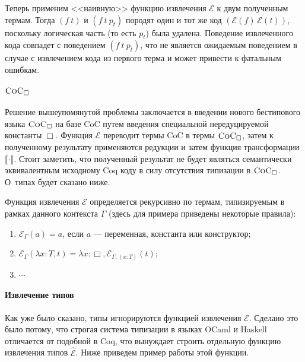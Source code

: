 Теперь применим <<наивную>> функцию извлечения $\mathcal{E}$ к двум полученным термам. Тогда $(f\ t)$ и $(f\ t\ p_t)$ породят один и тот же код $(\mathcal{E}(f)\ \mathcal{E}(t))$, поскольку логическая часть (то есть $p_t$) была удалена. Поведение извлеченного кода совпадет с поведением $(f\ t\ p_t)$, что не является ожидаемым поведением в случае с извлечением кода из первого терма и может привести к фатальным ошибкам.

\paragraph{$\textsc{CoC}_\Box$}

Решение вышеупомянутой проблемы заключается в введении нового бестипового языка $\textsc{CoC}_\Box$ на базе CoC путем введения специальной нередуцируемой константы $\Box$.  Функция $\mathcal{E}$ переводит термы CoC в термы $\textsc{CoC}_\Box$, затем к полученному результату применяются редукции и затем функция трансформации $\llbracket \cdot \rrbracket$. Стоит заметить, что полученный результат не будет являться семантически эквивалентным исходному Coq коду в силу отсутствия типизации в $\textsc{CoC}_\Box$. О~типах будет сказано ниже.

Функция извлечения $\mathcal{E}$ определяется рекурсивно по термам, типизируемым в рамках данного контекста $\Gamma$ (здесь для примера приведены некоторые правила):
\begin{enumerate}
\item $\mathcal{E}_{\Gamma}(a) = a$, если $a$ --- переменная, константа или конструктор;
\item $\mathcal{E}_{\Gamma}(\lambda x:T, t) = \lambda x :\Box, \mathcal{E}_{\Gamma;(x:T)} (t)$;
\item $\cdots$
\end{enumerate}


\paragraph{Извлечение типов} Как уже было сказано, типы игнорируются функцией извлечения $\mathcal{E}$. Сделано это было потому, что строгая система типизации в языках OCaml и Haskell отличается от подобной в Coq, что вынуждает строить отдельную функцию извлечения типов $\hat{\mathcal{E}}$. Ниже приведем пример работы этой функции.

